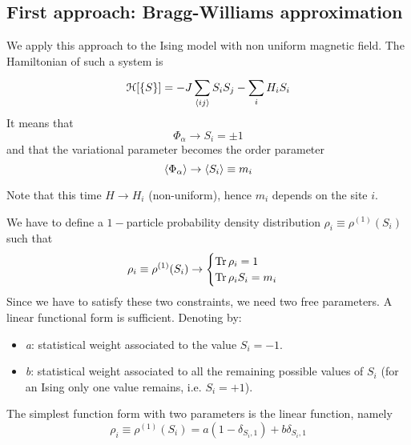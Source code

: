 \documentclass[../main/main.tex]{subfiles}
\begin{document}
\subsection{First approach: Bragg-Williams approximation}
We apply this approach to the Ising model with non uniform magnetic field. The Hamiltonian of such a system is 
\begin{equation}
  \mathcal{H} [\{ S \}  ] = - J \sum_{\expval{ij} }^{} S_i S_j - \sum_{i}^{} H_i S_i
\end{equation}
It means that
\begin{equation*}
  \Phi _ \alpha \rightarrow S_i = \pm 1
\end{equation*}
and that the variational parameter becomes the order parameter
\begin{equation*}
  \expval{\Phi _ \alpha } \rightarrow \expval{S_i}  \equiv m_i
\end{equation*}
\begin{remark}
Note that this time \( H \rightarrow H_i \) (non-uniform), hence \( m_i \) depends on the site \( i \).
\end{remark}
We have to define a \( 1- \)particle probability density distribution \( \rho _i \equiv \rho ^{(1)} (S_i) \) such that
\begin{equation}
  \rho_i \equiv \rho ^{(1)} (S_i) \rightarrow \begin{cases}
    \Tr \rho _i  = 1 \\
    \Tr \rho _i  S_i = m_i
\end{cases}
\end{equation}
Since we have to satisfy these two constraints, we need two free parameters. A linear functional form is sufficient. Denoting by:
\begin{itemize}
\item \emph{a}: statistical weight associated to the value \( S_i =-1\).
\item \emph{b}: statistical weight associated to all the remaining possible values of \( S_i \) (for an Ising only one value remains, i.e. \( S_i = +1 \)).
\end{itemize}
The simplest function form with two parameters is the linear function, namely
\begin{equation}
  \rho _i \equiv \rho^{(1)} (S_i) = a (1- \delta _{S_i,1}) + b \delta _{S_i,1}
\end{equation}
\end{document}

